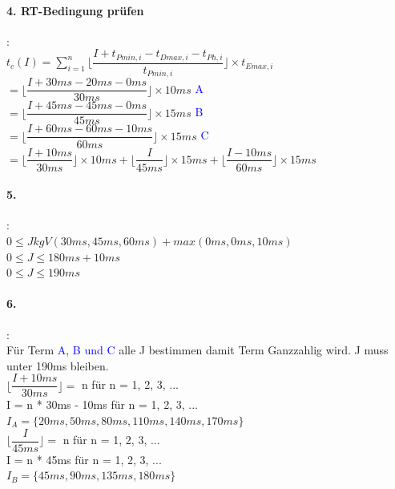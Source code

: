 \documentclass[12pt,a4paper,oneside,ngerman]{article}
\begin{document}
\paragraph{4. RT-Bedingung prüfen}:\\
\(t_{c}(I) = \displaystyle\sum_{i=1}^n \Big\lfloor \dfrac{I + t_{Pmin,i} - t_{Dmax,i} - t_{Ph,i} }{ t_{Pmin,i} } \Big\rfloor \times t_{Emax,i}\) \\
\(= \Big\lfloor \dfrac{I + 30ms - 20ms - 0ms }{ 30ms } \Big\rfloor \times 10ms\) \textcolor{blue}{A} \\
\(= \Big\lfloor \dfrac{I + 45ms - 45ms - 0ms }{ 45ms } \Big\rfloor \times 15ms\) \textcolor{blue}{B} \\
\(= \Big\lfloor \dfrac{I + 60ms - 60ms - 10ms }{ 60ms } \Big\rfloor \times 15ms\) \textcolor{blue}{C} \\
\(= \Big\lfloor \dfrac{I + 10ms }{ 30ms } \Big\rfloor \times 10ms + \Big\lfloor \dfrac{I}{ 45ms } \Big\rfloor \times 15ms + \Big\lfloor \dfrac{I - 10ms }{ 60ms } \Big\rfloor \times 15ms\)\\

\paragraph{5.}:\\
\( 0 \leq J kgV(30ms, 45ms, 60ms) + max(0ms, 0ms, 10ms) \) \\
\( 0 \leq J \leq 180ms + 10ms\)\\
\( 0 \leq J \leq 190ms\)\\

\paragraph{6.}:\\
Für Term \textcolor{blue}{A, B und C} alle J bestimmen damit Term Ganzzahlig wird. J muss unter 190ms bleiben.\\

\( \Big\lfloor \dfrac{I + 10ms }{ 30ms } \Big\rfloor = \) n für n = 1, 2, 3, ... \\
I = n * 30ms - 10ms für n = 1, 2, 3, ... \\
\( I_A = \{20ms, 50ms, 80ms, 110ms, 140ms, 170ms\} \)\\

\( \Big\lfloor \dfrac{I}{ 45ms } \Big\rfloor = \) n für n = 1, 2, 3, ... \\
I = n * 45ms für n = 1, 2, 3, ... \\
\( I_B = \{45ms, 90ms, 135ms, 180ms\} \)\\
\end{document}
